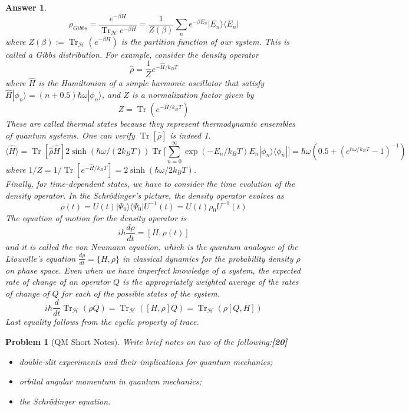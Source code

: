 \documentclass[a4paper]{article}
\DeclareMathOperator{\Tr}{Tr}
\newtheorem{ans}{Answer}[subsection]
\theoremstyle{new}
\newtheorem{qns}{Problem}[subsection]
\begin{document}
\begin{ans}
$$\rho_{Gibbs}=\frac{e^{-\beta H}}{\Tr_{\mathcal{H}}e^{-\beta H}}=\frac{1}{Z(\beta)}\sum_ne^{-\beta E_n}|E_n\rangle\langle E_n|$$
where $Z(\beta):=\Tr_{\mathcal{H}}(e^{-\beta H})$ is the partition function of our system. This is called a Gibbs distribution. For example, consider the density operator
$$\hat{\rho}=\frac{1}{Z}e^{-\hat{H}/k_BT}$$
where $\hat{H}$ is the Hamiltonian of a simple harmonic oscillator that satisfy $\hat{H}|\phi_n\rangle=(n+0.5)\hbar\omega|\phi_n\rangle$, and $Z$ is a normalization factor given by
$$Z=\Tr(e^{-\hat{H}/k_BT})$$
These are called thermal states because they represent thermodynamic ensembles of quantum systems. One can verify $\Tr[\hat{\rho}]$ is indeed 1.
$$\langle\hat{H}\rangle=\Tr[\hat{\rho}\hat{H}]2\sinh(\hbar\omega/(2k_BT))\Tr\bigg[\sum_{n=0}^\infty\exp(-E_n/k_BT)E_n|\phi_n\rangle\langle\phi_n|\bigg]=\hbar\omega(0.5+(e^{\hbar\omega/k_BT}-1)^{-1})$$
where $1/Z=1/\Tr[e^{-\hat{H}/k_BT}]=2\sinh(\hbar\omega/2k_BT)$.\\[5pt]
Finally, for time-dependent states, we have to consider the time evolution of the density operator. In the Schr\"{o}dinger's picture, the density operator evolves as
$$\rho(t)=U(t)|\Psi_0\rangle\langle\Psi_0|U^{-1}(t)=U(t)\rho_0U^{-1}(t)$$
The equation of motion for the density operator is
$$i\hbar\frac{d\rho}{dt}=[H,\rho(t)]$$
and it is called the von Neumann equation, which is the quantum analogue of the Liouville's equation $\frac{d\rho}{dt}=\{H,\rho\}$ in classical dynamics for the probability density $\rho$ on phase space. Even when we have imperfect knowledge of a system, the expected rate of change of an operator $Q$ is the appropriately weighted average of the rates of change of $Q$ for each of the possible states of the system.
$$i\hbar\frac{d}{dt}\Tr_{\mathcal{H}}(\rho Q)=\Tr_{\mathcal{H}}([H,\rho]Q)=\Tr_{\mathcal{H}}(\rho[Q,H])$$
Last equality follows from the cyclic property of trace.
\end{ans}
\newpage
\begin{qns}[QM Short Notes]
Write brief notes on two of the following:\hfill\textbf{[20]}
\begin{itemize}
    \item double-slit experiments and their implications for quantum mechanics;
    \item orbital angular momentum in quantum mechanics;
    \item the Schr\"{o}dinger equation.
\end{itemize}
\end{qns}
\end{document}
